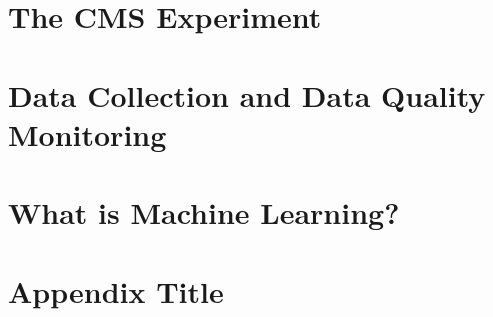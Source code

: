 \documentclass[12pt,twoside,openany]{book}
\begin{document}
\chapter{The CMS Experiment}\label{LHCCMS}


\chapter{Data Collection and Data Quality Monitoring }\label{DQMchapter}


\chapter{What is Machine Learning?}\label{ML}


%
%
%
%
%

\appendix
\chapter{Appendix Title}
%

{}

\end{document}
